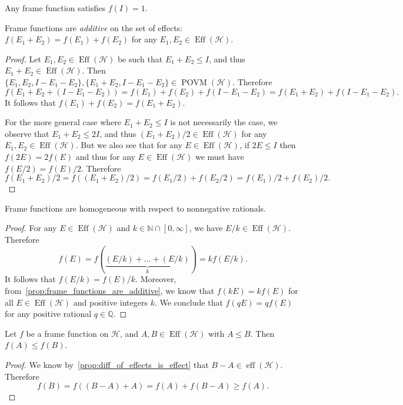 \documentclass[12pt]{report}
\newcommand{\NN}{\mathbb{N}}
\newcommand{\QQ}{\mathbb{Q}}
\newcommand{\on}[1]{\operatorname{#1}}
\newcommand{\calH}{{\mathcal{H}}}
\begin{document}
\begin{prop}
	Any frame function satisfies $f(I)=1$.
\end{prop}

\begin{prop}
	Frame functions are \emph{additive} on the set of effects:
	$f(E_1+E_2)=f(E_1)+f(E_2)$ for any $E_1,E_2\in\on{Eff}(\calH)$.
	\label{prop:frame_functions_are_additive}
\end{prop}
\begin{proof}
	Let $E_1,E_2\in\on{Eff}(\calH)$ be such that $E_1+E_2\le I$, and thus $E_1+E_2\in\on{Eff}(\calH)$.
	Then $\{E_1,E_2,I-E_1-E_2\},\{E_1+E_2,I-E_1-E_2\}\in\on{POVM}(\calH)$.
	Therefore
	\begin{equation}
		f(E_1 + E_2 + (I-E_1-E_2))
		= f(E_1) + f(E_2) + f(I-E_1-E_2)
		= f(E_1 + E_2) + f(I-E_1-E_2).
	\end{equation}
	It follows that $f(E_1)+f(E_2)=f(E_1+E_2)$.

	For the more general case where $E_1+E_2\le I$ is not necessarily the case, we observe that $E_1+E_2\le 2I$, and thus $(E_1+E_2)/2\in\on{Eff}(\calH)$ for any $E_1,E_2\in\on{Eff}(\calH)$.
	But we also see that for any $E\in\on{Eff}(\calH)$, if $2E\le I$ then $f(2E)=2f(E)$ and thus for any $E\in\on{Eff}(\calH)$ we must have $f(E/2)=f(E)/2$.
	Therefore
	\begin{equation}
		f(E_1+E_2)/2 = f((E_1+E_2)/2)
		= f(E_1/2) + f(E_2/2)
		= f(E_1)/2 + f(E_2)/2.
	\end{equation}
\end{proof}

\begin{prop}
	Frame functions are homogeneous with respect to nonnegative rationals.
\end{prop}
\begin{proof}
	For any $E\in\on{Eff}(\calH)$ and $k\in\NN\cap[0,\infty]$, we have $E/k\in\on{Eff}(\calH)$.
	Therefore
	\begin{equation}
		f(E) = f(\underbrace{(E/k)+...+(E/k)}_k)
		= k f(E/k).
	\end{equation}
	It follows that $f(E/k)=f(E)/k$.
	Moreover, from~\cref{prop:frame_functions_are_additive}, we know that
	$f(kE)=kf(E)$ for all $E\in\on{Eff}(\calH)$ and positive integers $k$.
	We conclude that $f(qE)=qf(E)$ for any positive rational $q\in\QQ$.
\end{proof}


\begin{prop}
	Let $f$ be a frame function on $\calH$, and $A,B\in\on{Eff}(\calH)$ with $A\le B$. Then $f(A)\le f(B)$.
	\label{prop:frame_functions_are_monotone}
\end{prop}
\begin{proof}
	We know by~\cref{prop:diff_of_effects_is_effect} that $B-A\in\on{eff}(\calH)$.
	Therefore
	\begin{equation}
		f(B) = f((B-A)+A) = f(A) + f(B-A) \ge f(A).
	\end{equation}
\end{proof}
\end{document}
